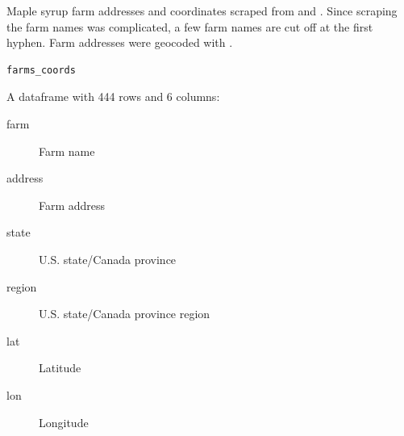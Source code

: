 %
\begin{Description}
Maple syrup farm addresses and coordinates scraped from
 and
.
Since scraping the farm names was complicated, a few farm names are cut
off at the first hyphen. Farm addresses were geocoded with
.
\end{Description}
%
\begin{Usage}
\begin{verbatim}
farms_coords
\end{verbatim}
\end{Usage}
%
\begin{Format}
%
\begin{SubSection}{}

A dataframe with 444 rows and 6 columns:
\begin{description}

\item[farm] Farm name
\item[address] Farm address
\item[state] U.S. state/Canada province
\item[region] U.S. state/Canada province region
\item[lat] Latitude
\item[lon] Longitude

\end{description}

\end{SubSection}

\end{Format}
